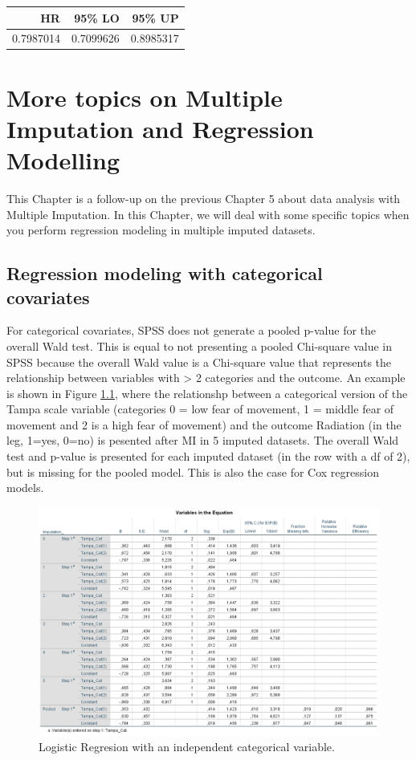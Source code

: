 \documentclass[]{book}
\begin{document}
\begin{tabular}{r|r|r}
\hline
HR & 95\% LO & 95\% UP\\
\hline
0.7987014 & 0.7099626 & 0.8985317\\
\hline
\end{tabular}

\chapter{More topics on Multiple Imputation and Regression
Modelling}\label{more-topics-on-multiple-imputation-and-regression-modelling}

This Chapter is a follow-up on the previous Chapter 5 about data
analysis with Multiple Imputation. In this Chapter, we will deal with
some specific topics when you perform regression modeling in multiple
imputed datasets.

\section{Regression modeling with categorical
covariates}\label{regression-modeling-with-categorical-covariates}

For categorical covariates, SPSS does not generate a pooled p-value for
the overall Wald test. This is equal to not presenting a pooled
Chi-square value in SPSS because the overall Wald value is a Chi-square
value that represents the relationship between variables with
\textgreater{} 2 categories and the outcome. An example is shown in
Figure \ref{fig:fig6-1}, where the relationshp between a categorical
version of the Tampa scale variable (categories 0 = low fear of
movement, 1 = middle fear of movement and 2 is a high fear of movement)
and the outcome Radiation (in the leg, 1=yes, 0=no) is pesented after MI
in 5 imputed datasets. The overall Wald test and p-value is presented
for each imputed dataset (in the row with a df of 2), but is missing for
the pooled model. This is also the case for Cox regression models.

\begin{figure}

{\centering \includegraphics[width=0.9\linewidth]{images/fig6.1_logistic} 

}

\caption{Logistic Regresion with an independent categorical variable.}\label{fig:fig6-1}
\end{figure}
\end{document}
